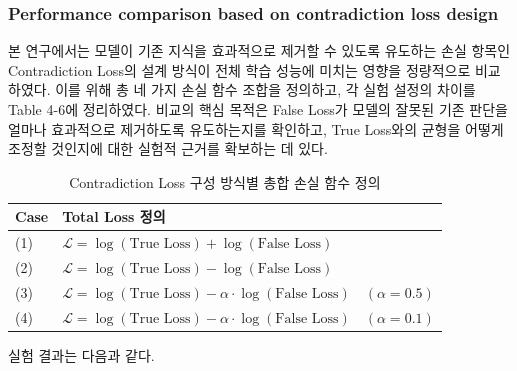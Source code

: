 \documentclass[a4paper,fleqn]{cas-sc}
\begin{document}
\subsubsection{Performance comparison based on contradiction loss design}

본 연구에서는 모델이 기존 지식을 효과적으로 제거할 수 있도록 유도하는 손실 항목인 Contradiction Loss의 설계 방식이 전체 학습 성능에 미치는 영향을 정량적으로 비교하였다. 이를 위해 총 네 가지 손실 함수 조합을 정의하고, 각 실험 설정의 차이를 Table 4-6에 정리하였다. 비교의 핵심 목적은 False Loss가 모델의 잘못된 기존 판단을 얼마나 효과적으로 제거하도록 유도하는지를 확인하고, True Loss와의 균형을 어떻게 조정할 것인지에 대한 실험적 근거를 확보하는 데 있다.

\begin{table}[H]
    \centering
    \renewcommand{\arraystretch}{1.3}
    \caption{Contradiction Loss 구성 방식별 총합 손실 함수 정의}
    \label{tab:loss-designs}
    \begin{tabularx}{\textwidth}{>{\raggedright\arraybackslash}p{1.2cm}X}
        \toprule
        \textbf{Case} & \textbf{Total Loss 정의} \\
        \midrule
        (1) & \( \mathcal{L} = \log(\text{True Loss}) + \log(\text{False Loss}) \) \\
        (2) & \( \mathcal{L} = \log(\text{True Loss}) - \log(\text{False Loss}) \) \\
        (3) & \( \mathcal{L} = \log(\text{True Loss}) - \alpha \cdot \log(\text{False Loss}) \quad (\alpha = 0.5) \)\\
        (4) & \( \mathcal{L} = \log(\text{True Loss}) - \alpha \cdot \log(\text{False Loss}) \quad (\alpha = 0.1) \) \\
        \bottomrule
    \end{tabularx}
\end{table}
   
실험 결과는 다음과 같다.
\end{document}
